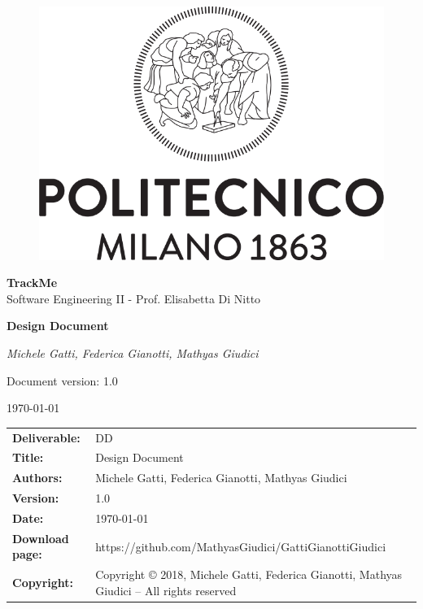 \documentclass[a4paper,12pt]{report}
\begin{document}
\begin{titlepage}
\centering
	\begin{center}{
		\begin{figure}[h]
		\large
		\centering
		{\includegraphics[width=.60\linewidth]{img/logo_poli}}
        \end{figure}
    	}
	\end{center}
	\vspace{1 cm}
	{\Large {\textbf{\LARGE TrackMe} \\
		Software Engineering II - Prof. Elisabetta Di Nitto} \par}
	\vspace{1.5cm}
	{\LARGE \textbf{Design Document} \par}
	\vspace{1.5cm}
	{\Large\itshape Michele Gatti, Federica Gianotti, Mathyas Giudici\par}
	\vspace{2cm}
	\vfill
	{\large Document version: 1.0\par}
	{\large \today \par}
\end{titlepage}

{
\begin{table}[h!]
\begin{tabu} to \textwidth { X[0.3,r,p] X[0.7,l,p] }
\textbf{Deliverable:} & DD\\
\textbf{Title:} & Design Document \\
\textbf{Authors:} & Michele Gatti, Federica Gianotti, Mathyas Giudici \\
\textbf{Version:} & 1.0 \\
\textbf{Date:} & \today \\
\textbf{Download page:} & https://github.com/MathyasGiudici/GattiGianottiGiudici \\
\textbf{Copyright:} & Copyright © 2018, Michele Gatti, Federica Gianotti, Mathyas Giudici – All rights reserved \\
\end{tabu}
\end{table}

\setcounter{page}{2}
}
\end{document}
